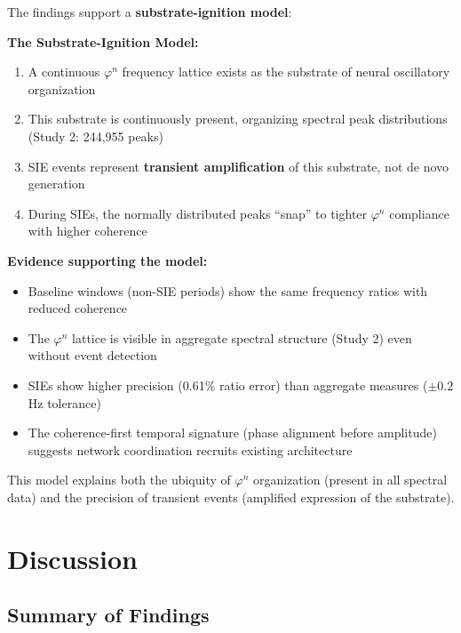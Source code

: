 \documentclass[11pt,a4paper]{article}
\newcommand{\phisym}{\varphi}
\begin{document}
The findings support a \textbf{substrate-ignition model}:

\begin{keyinsight}
\textbf{The Substrate-Ignition Model:}
\begin{enumerate}
    \item A continuous $\phisym^n$ frequency lattice exists as the substrate of neural oscillatory organization
    \item This substrate is continuously present, organizing spectral peak distributions (Study 2: 244,955 peaks)
    \item SIE events represent \textbf{transient amplification} of this substrate, not de novo generation
    \item During SIEs, the normally distributed peaks ``snap'' to tighter $\phisym^n$ compliance with higher coherence
\end{enumerate}
\end{keyinsight}

\textbf{Evidence supporting the model:}
\begin{itemize}
    \item Baseline windows (non-SIE periods) show the same frequency ratios with reduced coherence
    \item The $\phisym^n$ lattice is visible in aggregate spectral structure (Study 2) even without event detection
    \item SIEs show higher precision (0.61\% ratio error) than aggregate measures ($\pm 0.2$ Hz tolerance)
    \item The coherence-first temporal signature (phase alignment before amplitude) suggests network coordination recruits existing architecture
\end{itemize}

This model explains both the ubiquity of $\phisym^n$ organization (present in all spectral data) and the precision of transient events (amplified expression of the substrate).

\section{Discussion}

\subsection{Summary of Findings}
\end{document}
